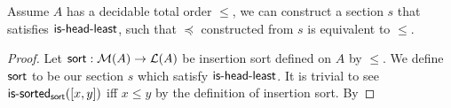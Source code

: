 \begin{proposition}
    Assume $A$ has a decidable total order $\leq$, we can construct a section $s$ that
    satisfies $\operatorname{\mathsf{is-head-least}}$, such that $\preccurlyeq$ constructed from $s$ is equivalent
    to $\leq$.
\end{proposition}

\begin{proof}
    Let $\operatorname{\mathsf{sort}} : \mathcal{M}(A) \to \mathcal{L}(A)$ be insertion sort defined on $A$ by $\leq$.
    We define $\operatorname{\mathsf{sort}}$ to be our section $s$ which satisfy $\operatorname{\mathsf{is-head-least}}$.
    It is trivial to see $\operatorname{\mathsf{is-sorted}}_{\operatorname{\mathsf{sort}}}([x, y])$ iff $x \leq y$ by the definition
    of insertion sort. By 
\end{proof}

